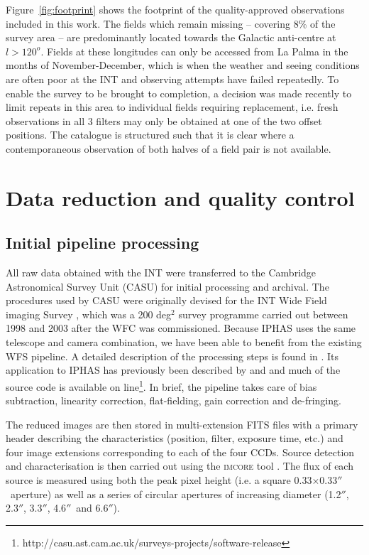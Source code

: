 \documentclass[useAMS,usenatbib]{mn2e}
\def\arcsec{$''$}
\begin{document}
Figure~\ref{fig:footprint} shows the footprint 
of the quality-approved observations included in this work. 
The fields which remain missing 
-- covering 8\% of the survey area --
are predominantly located towards the Galactic anti-centre 
at $l > 120^o$.
Fields at these longitudes can only be accessed from La Palma 
in the months of November-December,
which is when the weather and seeing conditions are often poor
at the INT and observing attempts have failed repeatedly.
To enable the survey to be brought to completion, 
a decision was made recently to limit repeats in this area 
to individual fields requiring replacement,
i.e. fresh observations in all 3 filters may only be obtained 
at one of the two offset positions.  
The catalogue is structured such that it is clear 
where a contemporaneous observation of both halves of a field pair
is not available.


\section{Data reduction and quality control}
\label{sec:reduction}

\subsection{Initial pipeline processing}

All raw data obtained with the INT were transferred
to the Cambridge Astronomical Survey Unit (CASU) 
for initial processing and archival.
The procedures used by CASU were originally devised
for the INT Wide Field imaging Survey \citep[WFS;][]{McMahon2001,Irwin2005},
which was a 200 deg$^2$ survey programme carried out 
between 1998 and 2003 after the WFC was commissioned.
Because IPHAS uses the same telescope and camera combination,
we have been able to benefit from the existing WFS pipeline.
A detailed description of the processing steps 
is found in \citet{Irwin2001}.
Its application to IPHAS has previously been described
by \citet{Drew2005} and \citet{Gonzalez-Solares2008}
and much of the source code is available 
on line\footnote{http://casu.ast.cam.ac.uk/surveys-projects/software-release}. 
In brief, the pipeline takes care of bias subtraction,
linearity correction, flat-fielding,
gain correction and de-fringing.

The reduced images are then stored in multi-extension FITS files
with a primary header describing the characteristics
(position, filter, exposure time, etc.) 
and four image extensions 
corresponding to each of the four CCDs.
Source detection and characterisation is then carried out 
using the \textsc{imcore} tool \citep{Irwin1985,Irwin1997}.
The flux of each source is measured using both
the peak pixel height (i.e. a square 0.33$\times$0.33\arcsec\ aperture)
as well as a series of circular apertures of increasing diameter 
(1.2\arcsec, 2.3\arcsec, 3.3\arcsec, 4.6\arcsec\ and 6.6\arcsec).
\end{document}
